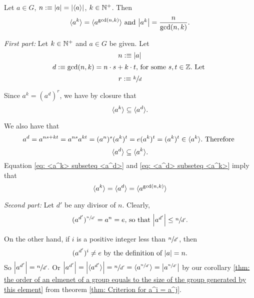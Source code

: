 \begin{thm}
  \label{thm: Relationship between an element of a cyclic group raised to a certain power and the order of that product}
  Let $a\in G$, $n:\equiv \abs{a}=\abs{\langle a \rangle}$, $k\in \mathbb{N}^+$. Then
  \begin{equation}
    \la a^k \ra = \la a^{\gcd(n,k)} \ra $ and $ \abs{a ^k} = \dfrac{n}{\gcd(n,k)}.
  \end{equation}
\end{thm}
\begin{prf} \emph{First part:}
  Let $k\in \mathbb{N}^+$ and $a\in G$ be given. Let
  \begin{equation}
    n :\equiv \abs{a}
  \end{equation}
  \begin{equation}
    d:\equiv \gcd(n,k) = n\cdot s + k \cdot t, $ for some $s,t \in \integer. $ Let $
  \end{equation}
  \begin{equation}
    r :\equiv \sfrac{k}{d}
  \end{equation}

  Since $a^k = (a^d)^r$, we have by closure that  \begin{equation}
    \label{eq: <a^k> subseteq <a^d>}
    \langle a^k \rangle \subseteq {\langle a^d \rangle}.
  \end{equation}

  We also have that
  \begin{equation}
    a^d = a^{ns+kt} = a^{ns}a^{kt} = (a^n)^s (a^k)^t = e (a^k)^t = (a^k)^t \in \la a^k \ra. $ Therefore $
  \end{equation}
  \begin{equation}
    \label{eq: <a^d> subseteq <a^k>}
    \langle a^d \rangle \subseteq \langle a^k \rangle.
  \end{equation}
  Equation \eqref{eq: <a^k> subseteq <a^d>} and \eqref{eq: <a^d> subseteq <a^k>} imply that
  \begin{equation}
    \langle a^k \rangle = \langle a^d \rangle = \langle a^{\gcd(n,k)} \rangle
  \end{equation}

  \emph{Second part:} Let $d'$ be any divisor of $n$. Clearly,
  \begin{equation}
    (a^{d'})^{\sfrac{n}{d'}} = a^n =e, $ so that $ \abs{a^{d'}} \leq \sfrac{n}{d'}.
  \end{equation}

  On the other hand, if $i$ is a positive integer less than $\sfrac{n}{d'}$, then
  \begin{equation}
    (a^{d'})^i \neq e $ by the definition of $ \abs{a}=n.
  \end{equation}
  So $\abs{a^{d'}} = \sfrac{n}{d'}.$ Or $ \abs{a^{d'}} = \abs{\langle a^{d'} \rangle} = \sfrac{n}{d'} = \langle a^{\sfrac{n}{d'}} \rangle = \abs{a^{\sfrac{n}{d'}}}$  by our corollary  \ref{thm: the order of an elmenet of a group equals to the size of the group generated by this element} from theorem \ref{thm: Criterion for a^i = a^j}.


\end{prf}

